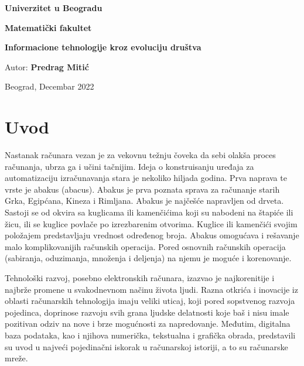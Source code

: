 \documentclass[12pt]{article}
\begin{document}
	
	\begin{titlepage}
		\thispagestyle{empty}
		\begin{center}
			\vspace*{1cm}
			\begin{large}\textbf{Univerzitet u Beogradu}
				
				\textbf{Matematički fakultet}
				
				\vspace{4cm}
				\textbf{\huge{Informacione tehnologije kroz evoluciju društva}}
			\end{large}
			
		\end{center}
		\vspace{7cm}
		\begin{flushright}
			Autor: \textbf{Predrag Mitić}
			

		\end{flushright}
		\vspace{1cm}
		\begin{center}
			Beograd, Decembar 2022
		\end{center}
	\end{titlepage}
	
	\tableofcontents
	
	\pagebreak
	
	\section{Uvod}
	
	Nastanak računara vezan je za vekovnu težnju čoveka da sebi olakša proces računanja, ubrza ga i učini tačnijim. Ideja o konstruisanju uređaja za automatizaciju izračunavanja stara je nekoliko hiljada godina. Prva naprava te vrste je abakus (abacus). Abakus je prva poznata sprava za računanje starih Grka, Egipćana, Kineza i Rimljana. Abakus je najčešće napravljen od drveta. Sastoji se od okvira sa kuglicama ili kamenčićima koji su nabodeni na štapiće ili žicu, ili se kuglice povlače po izrezbarenim otvorima. Kuglice ili kamenčići svojim položajem predstavljaju vrednost određenog broja. Abakus omogućava i rešavanje malo komplikovanijih računskih operacija. Pored osnovnih računskih operacija (sabiranja, oduzimanja, množenja i deljenja) na njemu je moguće i korenovanje.
	
	Tehnološki razvoj, posebno elektronskih računara, izazvao je najkorenitije i najbrže promene u svakodnevnom načinu života ljudi. Razna otkrića i inovacije iz oblasti računarskih tehnologija imaju veliki uticaj, koji pored sopstvenog razvoja pojedinca, doprinose razvoju svih grana ljudske delatnosti koje baš i nisu imale pozitivan odziv na nove  i brze mogućnosti za napredovanje. Međutim, digitalna baza podataka, kao i njihova numerička, tekstualna i grafička obrada, predstavili su uvod u najveći pojedinačni iskorak u računarskoj istoriji, a to su računarske mreže.
	
\end{document}
